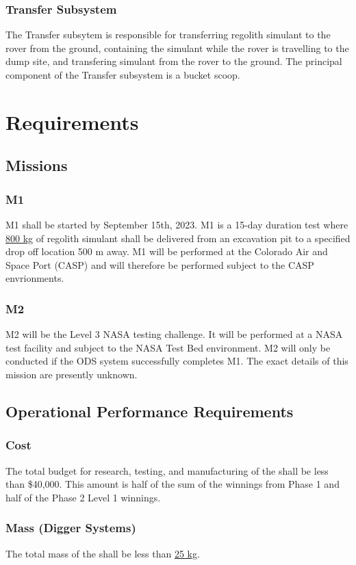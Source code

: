 \subsubsection{Transfer Subsystem}
\label{ref:Transfer Subsystem}
The Transfer subsytem is responsible for transferring  regolith simulant to the rover from the ground, containing the simulant while the rover is travelling to the dump site, and transfering simulant from the rover to the ground. The principal component of the Transfer subsystem is a bucket scoop.
\newpage
\section{Requirements}
\subsection{Missions}
\subsubsection{M1}
\label{ref:M1}
M1 shall be started by September 15th, 2023. M1 is a 15-day duration test where \hyperref[term:Daily Mass]{800 kg} of regolith simulant shall be delivered from an excavation pit to a specified drop off location 500 m away. M1 will be performed at the Colorado Air and Space Port (CASP) and will therefore be performed subject to the CASP envrionments.
\subsubsection{M2}
\label{ref:M2}
M2 will be the Level 3 NASA testing challenge. It will be performed at a NASA test facility and subject to the NASA Test Bed environment. M2 will only be conducted if the ODS system successfully completes M1. The exact details of this mission are presently unknown.
\subsection{Operational Performance Requirements}
\subsubsection{Cost}
\label{ref:Cost}
The total budget for research, testing, and manufacturing of the  shall be less than \$40,000. This amount is half of the sum of the winnings from Phase 1 and half of the Phase 2 Level 1 winnings.  
\subsubsection{Mass (Digger Systems)}
\label{ref:Mass (Digger Systems)}
The total mass of the  shall be less than \hyperref[term:DS Mass]{25 kg}.
